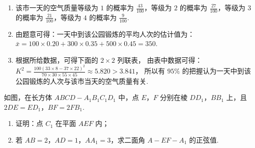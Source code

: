 \begin{solution}
\begin{enumerate}
\item 该市一天的空气质量等级为 \(1\) 的概率为 \(\frac{43}{100}\)，等级为 \(2\) 的概率为 \(\frac{27}{100}\)，等级为 \(3\) 的概率为 \(\frac{21}{100}\)，等级为 \(4\) 的概率为 \(\frac{9}{100}\).

\item 由题意可得：一天中到该公园锻炼的平均人次的估计值为：
\(\bar{x}=100\times0.20+300\times0.35+500\times0.45=350\).

\item 根据所给数据，可得下面的 \(2\times2\) 列联表，
由表中数据可得：
\(K^2=\frac{100(33\times8-37\times22)^2}{70\times30\times55\times45}\approx5.820>3.841\)，
所以有 \(95\%\) 的把握认为一天中到该公园锻炼的人次与该市当天的空气质量有关.
\end{enumerate}
\end{solution}

\begin{problem}
如图，在长方体 \(ABCD-A_1B_1C_1D_1\) 中，点 \(E\)，\(F\) 分别在棱 \(DD_1\)，\(BB_1\) 上，且 \(2DE=ED_1\)，\(BF=2FB_1\).

\begin{enumerate}
\item 证明：点 \(C_1\) 在平面 \(AEF\) 内；
\item 若 \(AB=2\)，\(AD=1\)，\(AA_1=3\)，求二面角 \(A-EF-A_1\) 的正弦值.
\end{enumerate}

\end{problem}

